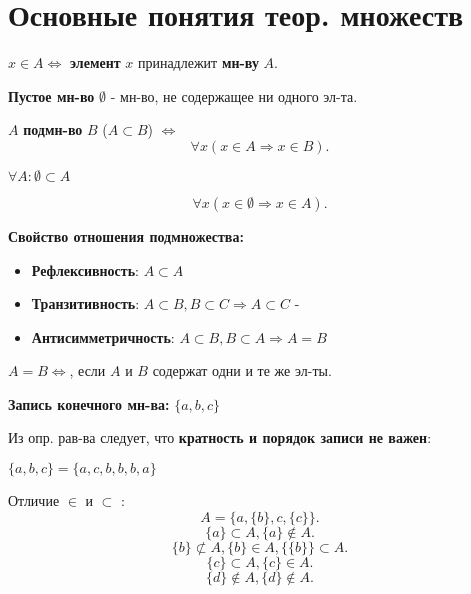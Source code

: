 \section{Основные понятия теор. множеств}
\begin{symb}
    $x \in A \iff$ \textbf{элемент } $x$ принадлежит \textbf{мн-ву} $A$.
\end{symb}
\begin{definition}
    \textbf{Пустое мн-во} $\emptyset$ - мн-во, не содержащее ни одного эл-та.
\end{definition}
\begin{definition}
    $A$ \textbf{подмн-во} $B$ ($A \subset B$) $\iff$ 
    \[
    \forall x (x \in A \Rightarrow x \in B)
    .\] 
\end{definition}
\begin{note}
    $\forall A \colon \emptyset \subset A$
\end{note}
\begin{note}
\[
\forall x (x \in \emptyset \Rightarrow x \in A)
.\] 
\end{note}
\textbf{Свойство отношения подмножества:}
\begin{itemize}
    \item \textbf{Рефлексивность}: $A \subset A$
    \item\textbf{Транзитивность}: $A \subset B, B \subset C \Rightarrow A \subset C$ - 
    \item \textbf{Антисимметричность}: $A \subset B, B \subset A \Rightarrow A = B$
\end{itemize}
\begin{definition}[Равенство мн-в]
$A = B \iff $, если $A$ и $B$ содержат одни и те же эл-ты.
\end{definition}
\textbf{Запись конечного мн-ва:} $\{a, b, c\}$
 \begin{note}
 Из опр. рав-ва следует, что \textbf{кратность и порядок записи не важен}:
 \begin{example}
    $\{a, b, c\} = \{a, c, b, b, b, a\}$
 \end{example}
 
\end{note}
 
\begin{note}
Отличие $\in$ и $\subset$ :
\[
A = \{a, \{b\}, c, \{c\}\}
.\] 
\[
\{a\} \subset A, \{a\} \not\in A
.\]  
\[
\{b\} \not\subset A, \{b\} \in A, \{\{b\}\} \subset A
.\] 
\[
\{c\} \subset A, \{c\}\in A
.\] 
\[
\{d\} \not\in A, \{ d\}\not\in A 
.\] 
\end{note}

